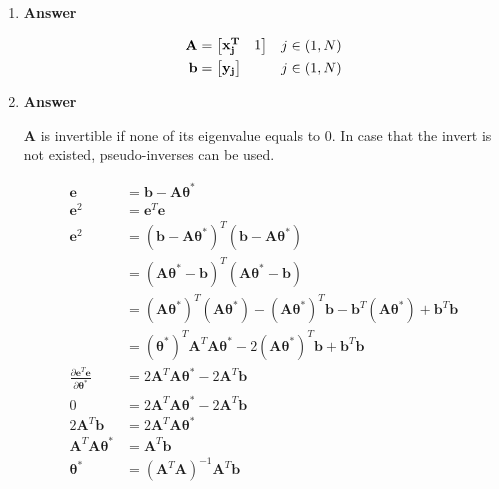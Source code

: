 \documentclass[11pt]{article}
\begin{document}
\begin{enumerate}[label=(\alph*)]

\item  \textbf{Answer}

\begin{align*}
\mathbf{A}& = 
\begin{bmatrix}
\mathbf{x_j^T} & 1 
\end{bmatrix} 
 && \text{$ j \in (1,N)$} \\
\mathbf{b} &=
\begin{bmatrix}
\mathbf{y_j}
\end{bmatrix} 
 && \text{$ j \in (1,N)$}
\end{align*}

\newpage

\item  \textbf{Answer}

$\mathbf{A}$ is invertible if none of its eigenvalue equals to 0. In case that the invert is not existed, pseudo-inverses can be used.

\begin{align*}
\mathbf{e}& = \mathbf{b}-\mathbf{A} \mathbf{\theta}^* \\
\mathbf{e}^2& =\mathbf{e}^T \mathbf{e} \\
\mathbf{e}^2& = (\mathbf{b}-\mathbf{A} \mathbf{\theta}^*)^T(\mathbf{b}-\mathbf{A} \mathbf{\theta}^*) \\
& = (\mathbf{A} \mathbf{\theta}^*-\mathbf{b})^T(\mathbf{A} \mathbf{\theta}^*-\mathbf{b}) \\
&= (\mathbf{A} \mathbf{\theta}^*)^T(\mathbf{A} \mathbf{\theta}^*)-(\mathbf{A} \mathbf{\theta}^*)^T \mathbf{b} - \mathbf{b}^T(\mathbf{A} \mathbf{\theta}^*) + \mathbf{b}^T\mathbf{b}\\
&=(\mathbf{\theta}^*)^T \mathbf{A}^T \mathbf{A} \mathbf{\theta}^* -2(\mathbf{A} \mathbf{\theta}^*)^T \mathbf{b}+ \mathbf{b}^T \mathbf{b} \\
\frac{\partial{\mathbf{e}^T \mathbf{e}}}{\partial{\mathbf{\theta}^*}} &= 2\mathbf{A}^T \mathbf{A} \mathbf{\theta}^* -2\mathbf{A}^T \mathbf{b}\\
0 &= 2\mathbf{A}^T \mathbf{A} \mathbf{\theta}^* -2\mathbf{A}^T \mathbf{b}\\
2\mathbf{A}^T \mathbf{b} &= 2\mathbf{A}^T \mathbf{A} \mathbf{\theta}^* \\
\mathbf{A}^T \mathbf{A} \mathbf{\theta}^* &= \mathbf{A}^T \mathbf{b}  \\
\mathbf{\theta}^* &= (\mathbf{A}^T \mathbf{A} )^{-1}\mathbf{A}^T \mathbf{b}  \\
\end{align*}


\end{enumerate}
\end{document}
